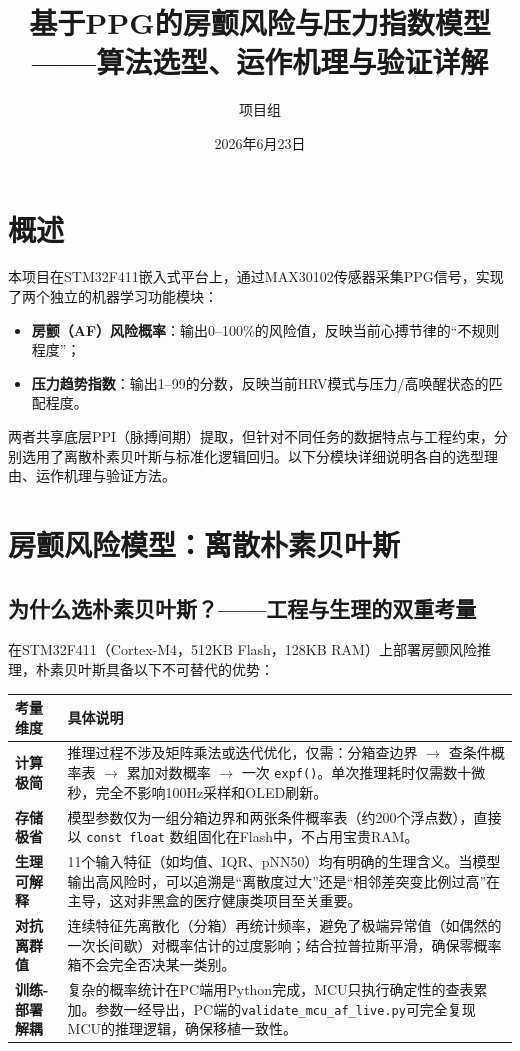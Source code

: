\documentclass[UTF8]{ctexart}
\title{基于PPG的房颤风险与压力指数模型\\——算法选型、运作机理与验证详解}
\author{项目组}
\date{2026年6月23日}
\begin{document}
\maketitle

\section{概述}
本项目在STM32F411嵌入式平台上，通过MAX30102传感器采集PPG信号，实现了两个独立的机器学习功能模块：
\begin{itemize}
    \item \textbf{房颤（AF）风险概率}：输出0--100\%的风险值，反映当前心搏节律的“不规则程度”；
    \item \textbf{压力趋势指数}：输出1--99的分数，反映当前HRV模式与压力/高唤醒状态的匹配程度。
\end{itemize}
两者共享底层PPI（脉搏间期）提取，但针对不同任务的数据特点与工程约束，分别选用了离散朴素贝叶斯与标准化逻辑回归。以下分模块详细说明各自的选型理由、运作机理与验证方法。

\section{房颤风险模型：离散朴素贝叶斯}

\subsection{为什么选朴素贝叶斯？——工程与生理的双重考量}

在STM32F411（Cortex-M4，512KB Flash，128KB RAM）上部署房颤风险推理，朴素贝叶斯具备以下不可替代的优势：

\begin{table}[ht]
\centering
\begin{tabular}{@{}p{3.2cm}p{10cm}@{}}
\toprule
\textbf{考量维度} & \textbf{具体说明} \\
\midrule
\textbf{计算极简} & 推理过程不涉及矩阵乘法或迭代优化，仅需：分箱查边界 $\rightarrow$ 查条件概率表 $\rightarrow$ 累加对数概率 $\rightarrow$ 一次 \texttt{expf()}。单次推理耗时仅需数十微秒，完全不影响100Hz采样和OLED刷新。 \\
\textbf{存储极省} & 模型参数仅为一组分箱边界和两张条件概率表（约200个浮点数），直接以 \texttt{const float} 数组固化在Flash中，不占用宝贵RAM。 \\
\textbf{生理可解释} & 11个输入特征（如均值、IQR、pNN50）均有明确的生理含义。当模型输出高风险时，可以追溯是“离散度过大”还是“相邻差突变比例过高”在主导，这对非黑盒的医疗健康类项目至关重要。 \\
\textbf{对抗离群值} & 连续特征先离散化（分箱）再统计频率，避免了极端异常值（如偶然的一次长间歇）对概率估计的过度影响；结合拉普拉斯平滑，确保零概率箱不会完全否决某一类别。 \\
\textbf{训练-部署解耦} & 复杂的概率统计在PC端用Python完成，MCU只执行确定性的查表累加。参数一经导出，PC端的\texttt{validate\_mcu\_af\_live.py}可完全复现MCU的推理逻辑，确保移植一致性。 \\
\bottomrule
\end{tabular}
\end{table}
\end{document}
